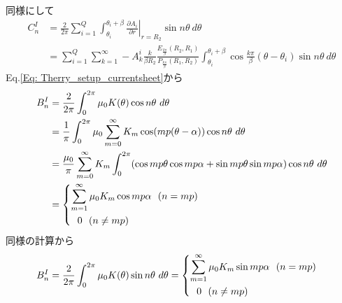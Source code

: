 \documentclass[a4paper, 11pt]{article}
\begin{document}
同様にして
\begin{align}
    C_n^I & = \frac{2}{2\pi}\sum_{i=1}^Q \int_{\theta_i}^{\theta_i+\beta} \left. \frac{\partial A_i}{\partial r} \right|_{r=R_2} \sin n\theta~d\theta\\  
    & = \sum_{i=1}^Q \sum_{k=1}^\infty -A_k^i \frac{k}{\beta R_2}\frac{E_{\frac{k\pi}{\beta}}(R_2,R_1)}{P_{\frac{k\pi}{\beta}}(R_1,R_2)}\int_{\theta_i}^{\theta_i+\beta} \cos \frac{k\pi}{\beta}(\theta-\theta_i)\sin n\theta~d\theta
\end{align}
Eq.\eqref{Eq: Therry_setup_currentsheet}から
\begin{align}
    B_n^I & = \frac{2}{2\pi} \int_0^{2\pi} \mu_0 K(\theta) \cos n\theta~d\theta\\
    & = \frac{1}{\pi}\int_0^{2\pi} \mu_0\sum_{m=0}^\infty K_m \cos (mp(\theta-\alpha)) \cos n\theta~d\theta\\
    & = \frac{\mu_0}{\pi} \sum_{m=0}^\infty K_m \int_0^{2\pi} (\cos mp\theta \cos mp\alpha + \sin mp\theta \sin mp\alpha)\cos n\theta~d\theta\\
    & = 
    \begin{dcases}
    \sum_{m=1}^\infty \mu_0 K_m \cos mp\alpha ~~ (n=mp)\\
    ~~ 0 ~~(n\neq mp)
    \end{dcases}
\end{align}
同様の計算から
\begin{align}
    B_n^I & = \frac{2}{2\pi} \int_0^{2\pi} \mu_0 K(\theta) \sin n\theta~d\theta = 
    \begin{dcases}
    \sum_{m=1}^\infty \mu_0 K_m \sin mp\alpha ~~ (n=mp)\\
    ~~ 0 ~~(n\neq mp)
    \end{dcases}
\end{align}


\color{Black}
\end{document}
